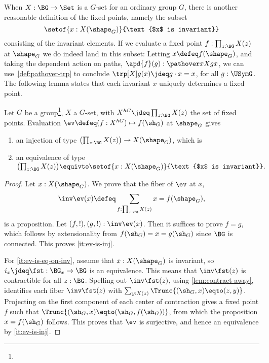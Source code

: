 When $X : \BG \to \Set$ is a $G$-set for an ordinary group $G$,
there is another reasonable definition of the fixed points,
namely the subset
\[
  \setof{x : X(\shape_G)}{\text{$x$ is invariant}}
\]
consisting of the invariant elements.
If we evaluate a fixed point $f : \prod_{z:\BG}X(z)$ at $\shape_G$
we do indeed land in this subset:
Letting $x\defeq f(\shape_G)$,
and taking the dependent action on paths,
$\apd{f}(g) : \pathover x X g x$,
we can use~\cref{def:pathover-trp} to conclude
$\trp[X] g(x)\jdeq g\cdot x = x$, for all $g:\USymG$.
The following lemma states that each invariant $x$ uniquely
determines a fixed point.

\begin{lemma}\label{lem:fixpts-are-fixed}
  Let $G$ be a group\footnote{}, 
  $X$ a $G$-set, with $X^{hG} \jdeq \prod_{z:\BG}X(z)$
  the set of fixed points. 
  Evaluation $\ev\defeq(f:X^{hG})\mapsto f(\sh_G)$ at $\shape_G$ gives
  \begin{enumerate}
  \item\label{it:ev-is-inj} 
  an injection of type $\bigl(\prod_{z:\BG}X(z)\bigr) \to X(\shape_G)$, which is
  \item\label{it:ev-is-eq-on-inv} an equivalence of type 
  $\bigl(\prod_{z:\BG}X(z)\bigr) \equivto
  \setof{x : X(\shape_G)}{\text{$x$ is invariant}}.$
  \end{enumerate}
\end{lemma}
\begin{proof}
  Let $x : X(\shape_G)$. We prove that the fiber of $\ev$ at $x$,
  \[
    \inv\ev(x) \defeq \sum_{f : \prod_{z:\BG}X(z)} x=f(\shape_G),
  \]
  is a proposition. Let $(f,!),(g,!) : \inv\ev(x)$. 
  Then it suffices to prove $f=g$, which follows by extensionality
  from $f(\sh_G)=x=g(\sh_G)$ since $\BG$ is connected. This proves
  \ref{it:ev-is-inj}.
  
  For \ref{it:ev-is-eq-on-inv}, assume that
  $x : X(\shape_G)$ is invariant, so $i_x\jdeq\fst:\BG_x \to \BG$
  is an equivalence. This means that $\inv\fst(z)$ is contractible
  for all $z:\BG$. Spelling out $\inv\fst(z)$, using \cref{lem:contract-away},
  identifies each fiber $\inv\fst(z)$ with
  $\sum_{y:X(z)}\Trunc{(\sh_G,x)\eqto(z,y)}$.
  Projecting on the first component of each center of contraction
  gives a fixed point $f$ such that $\Trunc{(\sh_G,x)\eqto(\sh_G,f(\sh_G))}$,
  from which the proposition $x=f(\sh_G)$ follows. This proves that
  $\ev$ is surjective, and hence an equivalence by \ref{it:ev-is-inj}.
\end{proof}


